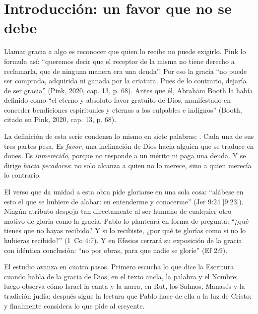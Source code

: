 
\section{Introducción: un favor que no se debe}

Llamar gracia a algo es reconocer que quien lo recibe no puede exigirlo. Pink lo formula así: ``queremos decir que el receptor de la misma no tiene derecho a reclamarla, que de ninguna manera era una deuda''. Por eso la gracia ``no puede ser comprada, adquirida ni ganada por la criatura. Pues de lo contrario, dejaría de ser gracia'' (Pink, 2020, cap. 13, p. 68). Antes que él, Abraham Booth la había definido como ``el eterno y absoluto favor gratuito de Dios, manifestado en conceder bendiciones espirituales y eternas a los culpables e indignos'' (Booth, citado en Pink, 2020, cap. 13, p. 68).

La definición de esta serie condensa lo mismo en siete palabras: . Cada una de sus tres partes pesa. Es \emph{favor}, una inclinación de Dios hacia alguien que se traduce en dones. Es \emph{inmerecido}, porque no responde a un mérito ni paga una deuda. Y se dirige \emph{hacia pecadores}: no solo alcanza a quien no lo merece, sino a quien merecía lo contrario.

El verso que da unidad a esta obra pide gloriarse en una sola cosa: ``alábese en esto el que se hubiere de alabar: en entenderme y conocerme'' (Jer 9:24 [9:23]). Ningún atributo despoja tan directamente al ser humano de cualquier otro motivo de gloria como la gracia. Pablo lo planteará en forma de pregunta: ``¿qué tienes que no hayas recibido? Y si lo recibiste, ¿por qué te glorías como si no lo hubieras recibido?'' (1~Co 4:7). Y en Efesios cerrará su exposición de la gracia con idéntica conclusión: ``no por obras, para que nadie se gloríe'' (Ef 2:9).

El estudio avanza en cuatro pasos. Primero escucha lo que dice la Escritura cuando habla de la gracia de Dios, en el texto ancla, la palabra y el Nombre; luego observa cómo Israel la canta y la narra, en Rut, los Salmos, Manasés y la tradición judía; después sigue la lectura que Pablo hace de ella a la luz de Cristo; y finalmente considera lo que pide al creyente.

